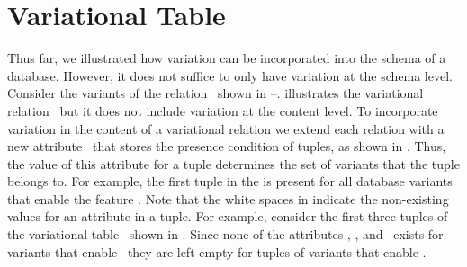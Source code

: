 \section{Variational Table}
\label{sec:vtab}


Thus far, 
we illustrated how variation can be incorporated into the schema of a database.
However, it does not suffice to only have variation at the schema level. Consider the 
variants of the relation \empbio\ shown in --.
 illustrates the variational relation \empbio\ but it does not include
variation at the content level.
To incorporate variation in the content of a variational relation we
extend each relation with a new attribute \pcatt\ that stores 
the presence condition of tuples, as shown in
. Thus,
the value of this attribute for a tuple determines the set of variants that the tuple
belongs to. For example, the first tuple in the  is present for
all database variants that enable the feature \vThree. 
%
Note that the white spaces in  indicate the non-existing values
for an attribute in a tuple. For example, consider the first three tuples of the variational
table \empbio\ shown in . Since none of the attributes \name, \fname, and \lname\
exists for variants that enable \vThree\ they are left empty for tuples of variants that enable
\vThree.




